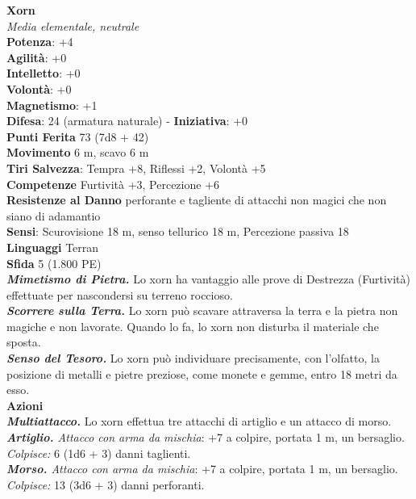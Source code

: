 \begin{multicols}{2}
\medskip\textbf{Xorn}\\
\emph{Media elementale, neutrale}\\
\textbf{Potenza}: +4\\
\textbf{Agilità}: +0\\
\textbf{Intelletto}: +0\\
\textbf{Volontà}: +0\\
\textbf{Magnetismo}: +1\\
\textbf{Difesa}: 24 (armatura naturale) - \textbf{Iniziativa}: +0\\
\textbf{Punti Ferita} 73 (7d8 + 42)\\
\textbf{Movimento} 6 m, scavo 6 m\\
\textbf{Tiri Salvezza}: Tempra +8, Riflessi +2, Volontà +5\\
\textbf{Competenze} Furtività +3, Percezione +6\\
\textbf{Resistenze al Danno} perforante e tagliente di attacchi non magici che non siano di adamantio\\
\textbf{Sensi}: Scurovisione 18 m, senso tellurico 18 m, Percezione passiva 18\\
\textbf{Linguaggi} Terran\\
\textbf{Sfida} 5 (1.800 PE)\smallskip\\
\emph{\textbf{Mimetismo di Pietra.}} Lo xorn ha vantaggio alle prove di Destrezza (Furtività) effettuate per nascondersi su terreno roccioso.\\
\emph{\textbf{Scorrere sulla Terra.}} Lo xorn può scavare attraversa la terra e la pietra non magiche e non lavorate. Quando lo fa, lo xorn non disturba il materiale che sposta.\\
\emph{\textbf{Senso del Tesoro.}} Lo xorn può individuare precisamente, con l'olfatto, la posizione di metalli e pietre preziose, come monete e gemme, entro 18 metri da esso.\\
\smallskip\textbf{Azioni}\\
\emph{\textbf{Multiattacco.}} Lo xorn effettua tre attacchi di artiglio e un attacco di morso.\\
\emph{\textbf{Artiglio.} Attacco con arma da mischia}: +7 a colpire, portata 1 m, un bersaglio.\\
\emph{Colpisce:} 6 (1d6 + 3) danni taglienti.\\
\emph{\textbf{Morso.} Attacco con arma da mischia}: +7 a colpire, portata 1 m, un bersaglio.\\
\emph{Colpisce:} 13 (3d6 + 3) danni perforanti.\\

\end{multicols}
